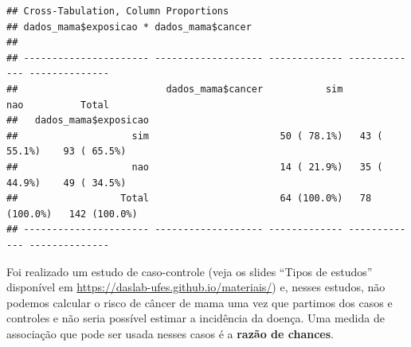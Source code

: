 \documentclass[
]{book}
\newenvironment{Shaded}{\begin{snugshade}}{\end{snugshade}}
\newcommand{\CommentTok}[1]{\textcolor[rgb]{0.56,0.35,0.01}{\textit{#1}}}
\newcommand{\DataTypeTok}[1]{\textcolor[rgb]{0.13,0.29,0.53}{#1}}
\newcommand{\KeywordTok}[1]{\textcolor[rgb]{0.13,0.29,0.53}{\textbf{#1}}}
\newcommand{\NormalTok}[1]{#1}
\newcommand{\OperatorTok}[1]{\textcolor[rgb]{0.81,0.36,0.00}{\textbf{#1}}}
\newcommand{\StringTok}[1]{\textcolor[rgb]{0.31,0.60,0.02}{#1}}
\begin{document}
\begin{Shaded}
\end{Shaded}

\begin{verbatim}
## Cross-Tabulation, Column Proportions  
## dados_mama$exposicao * dados_mama$cancer  
## 
## ---------------------- ------------------- ------------- ------------- --------------
##                          dados_mama$cancer           sim           nao          Total
##   dados_mama$exposicao                                                               
##                    sim                       50 ( 78.1%)   43 ( 55.1%)    93 ( 65.5%)
##                    nao                       14 ( 21.9%)   35 ( 44.9%)    49 ( 34.5%)
##                  Total                       64 (100.0%)   78 (100.0%)   142 (100.0%)
## ---------------------- ------------------- ------------- ------------- --------------
\end{verbatim}

Foi realizado um estudo de caso-controle (veja os slides ``Tipos de estudos'' disponível em \url{https://daslab-ufes.github.io/materiais/}) e, nesses estudos, não podemos calcular o risco de câncer de mama uma vez que partimos dos casos e controles e não seria possível estimar a incidência da doença. Uma medida de associação que pode ser usada nesses casos é a \textbf{razão de chances}.
\end{document}
